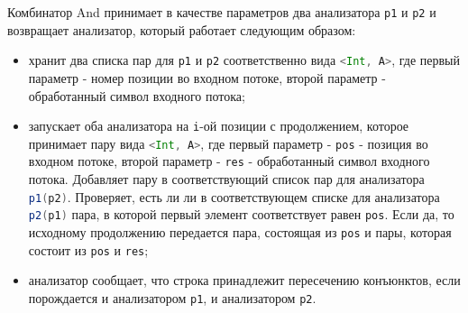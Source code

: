 \documentclass[14pt]{matmex-diploma}
\begin{document}
Комбинатор And принимает в качестве параметров два анализатора \lstinline[language=Scala]{p1} и \lstinline[language=Scala]{p2} и возвращает анализатор, который работает следующим образом: 
\begin{itemize}
    \item хранит два списка пар  для \lstinline[language=Scala]{p1} и \lstinline[language=Scala]{p2} соответственно вида \lstinline[language=Scala]{<Int, A>}, где первый параметр - номер позиции во входном потоке, второй параметр - обработанный символ входного потока;
    \item запускает оба анализатора на \lstinline[language=Scala]{i}-ой позиции с продолжением, которое принимает пару вида \lstinline[language=Scala]{<Int, A>}, где первый параметр - \lstinline[language=Scala]{pos} - позиция во входном потоке, второй параметр - \lstinline[language=Scala]{res} - обработанный символ входного потока. Добавляет пару в соответствующий список пар для анализатора \lstinline[language=Scala]{p1(p2)}. Проверяет, есть ли ли в соответствующем списке для анализатора \lstinline[language=Scala]{p2(p1)} пара, в которой первый элемент соответствует равен \lstinline[language=Scala]{pos}. Если да, то исходному продолжению передается пара, состоящая из \lstinline[language=Scala]{pos} и пары, которая состоит из \lstinline[language=Scala]{pos} и \lstinline[language=Scala]{res};
    \item анализатор сообщает, что строка принадлежит пересечению конъюнктов, если порождается и анализатором \lstinline[language=Scala]{p1}, и анализатором \lstinline[language=Scala]{p2}.
\end{itemize}
\end{document}
